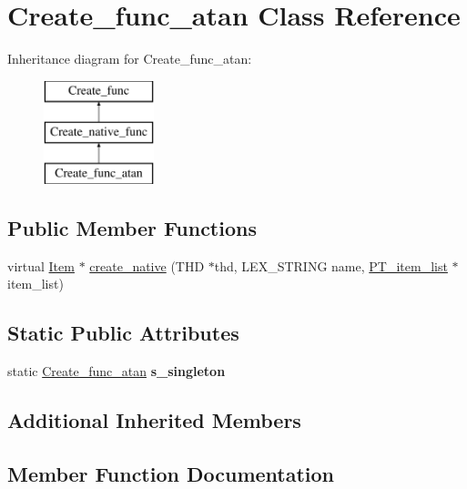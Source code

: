 \hypertarget{classCreate__func__atan}{}\section{Create\+\_\+func\+\_\+atan Class Reference}
\label{classCreate__func__atan}
Inheritance diagram for Create\+\_\+func\+\_\+atan\+:\begin{figure}[H]
\begin{center}
\leavevmode
\includegraphics[height=3.000000cm]{classCreate__func__atan}
\end{center}
\end{figure}
\subsection*{Public Member Functions}
\begin{DoxyCompactItemize}
\item 
virtual \mbox{\hyperlink{classItem}{Item}} $\ast$ \mbox{\hyperlink{classCreate__func__atan_a7d087ec61fb03bc1107e3ba766e44c33}{create\+\_\+native}} (T\+HD $\ast$thd, L\+E\+X\+\_\+\+S\+T\+R\+I\+NG name, \mbox{\hyperlink{classPT__item__list}{P\+T\+\_\+item\+\_\+list}} $\ast$item\+\_\+list)
\end{DoxyCompactItemize}
\subsection*{Static Public Attributes}
\begin{DoxyCompactItemize}
\item 
\mbox{\label{classCreate__func__atan_a8e3925fdb8acf35da258bdb41cfb1bbc}} 
static \mbox{\hyperlink{classCreate__func__atan}{Create\+\_\+func\+\_\+atan}} {\bfseries s\+\_\+singleton}
\end{DoxyCompactItemize}
\subsection*{Additional Inherited Members}


\subsection{Member Function Documentation}
\mbox{\label{classCreate__func__atan_a7d087ec61fb03bc1107e3ba766e44c33}} 
